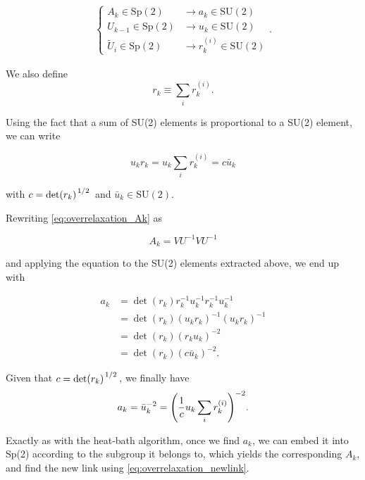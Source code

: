 \documentclass[reqno,12pt]{article}
\numberwithin{equation}{section}
\newcommand{\SU}{\mathrm{SU}}
\newcommand{\Sp}{\mathrm{Sp}}
\begin{document}
\begin{eqnarray}
	\begin{cases}
		A_k \in \Sp(2) &\longrightarrow a_k \in \SU(2) \\
		U_{k-1} \in \Sp(2) &\longrightarrow u_k \in \SU(2) \\
		\widetilde{U}_i \in \Sp(2) &\longrightarrow r_k^{(i)} \in \SU(2)
	\end{cases}.
\end{eqnarray}

We also define
\begin{equation}
	r_k \equiv \sum_i r_k^{(i)}.
\end{equation}

Using the fact that a sum of SU(2) elements is proportional to a SU(2) element, we can write

\begin{equation}
	u_k r_k = u_k \sum_i r_k^{(i)} = c \bar{u}_k
\end{equation}

with $c = \det(r_k)^{\flatfrac{1}{2}}$ and $\bar{u}_k \in \SU(2)$.

Rewriting \eqref{eq:overrelaxation_Ak} as

\begin{equation}
	A_k = V U^{-1} V U^{-1}
\end{equation}

and applying the equation to the SU(2) elements extracted above, we end up with

\begin{equation}
	\begin{aligned}
		a_k &= \det(r_k) r_k^{-1} u_k^{-1} r_k^{-1} u_k^{-1} \\
		&= \det(r_k) (u_k r_k)^{-1} (u_k r_k)^{-1} \\
		&= \det(r_k) (r_k u_k)^{-2} \\
		&= \det(r_k) (c \bar{u}_k)^{-2}.
	\end{aligned}
\end{equation}

Given that $c = \det(r_k)^{\flatfrac{1}{2}}$, we finally have
\begin{equation}
	a_k = \bar{u}_k^{-2} = \qty(\frac{1}{c} u_k \sum_i r_k^{(i)})^{-2}.
\end{equation}

Exactly as with the heat-bath algorithm, once we find $a_k$, we can embed it into Sp(2) according to the
subgroup it belongs to, which yields the corresponding $A_k$, and find the new link using \eqref{eq:overrelaxation_newlink}.
\end{document}

